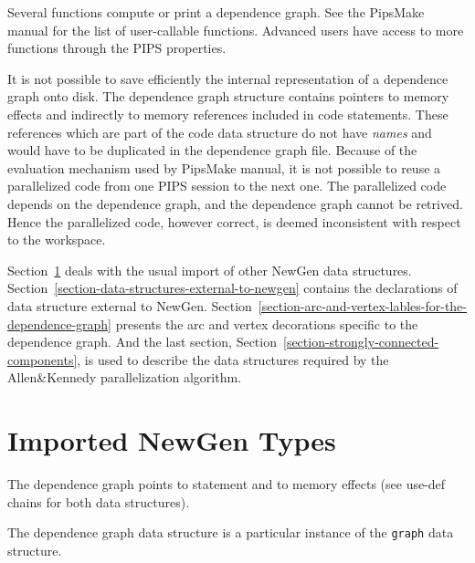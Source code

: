 \documentclass[a4paper]{article}
\begin{document}
Several functions compute or print a dependence graph. See the
PipsMake manual for the list of
user-callable functions. Advanced users have access to more functions
through the PIPS properties.

It is not possible to save efficiently
the internal representation of a dependence graph onto disk. The
dependence graph structure contains pointers to memory effects and
indirectly to memory references included in code statements. These
references which are part of the code data structure do not have {\em
  names} and would have to be duplicated in the dependence graph
file. Because of the evaluation mechanism used by PipsMake manual,
it is not possible to
reuse a parallelized code from one PIPS session to the next one. The
parallelized code depends on the dependence graph, and the dependence
graph cannot be retrived. Hence the parallelized code, however correct, is
deemed inconsistent with respect to the workspace.

Section~\ref{section-imported-newgen-types} deals with the usual import of
other NewGen data structures.
Section~\ref{section-data-structures-external-to-newgen} contains the
declarations of data structure external to NewGen.
Section~\ref{section-arc-and-vertex-lables-for-the-dependence-graph}
presents the arc and vertex decorations specific to the dependence graph.
And the last section, Section~\ref{section-strongly-connected-components},
is used to describe the data structures required by the Allen\&Kennedy
parallelization algorithm.

\section{Imported NewGen Types}
\label{section-imported-newgen-types}

The dependence graph points to statement and to memory effects (see
use-def chains for both data structures).


\begin{comment}
\domain{Import statement from "ri.newgen"}
{}
\end{comment}

{}

The dependence graph data structure is  a particular instance of the
\verb/graph/ data structure.
\end{document}
